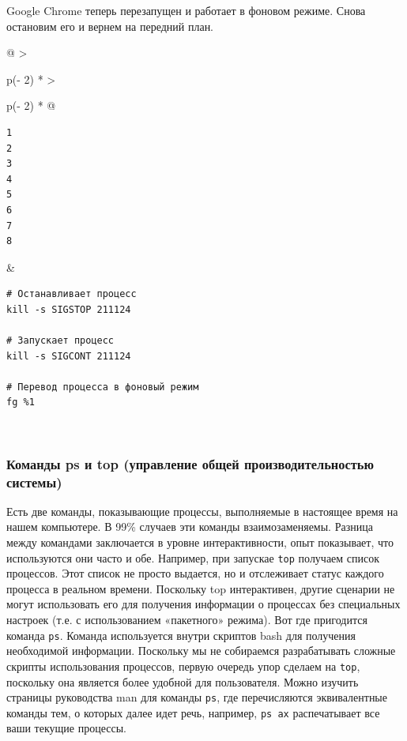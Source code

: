 \documentclass{report}
\begin{document}
Google Chrome теперь перезапущен и работает в фоновом режиме. Снова
остановим его и вернем на передний план.

\begin{longtable}[]{@{}
  >{\raggedright\arraybackslash}p{(\columnwidth - 2\tabcolsep) * }
  >{\raggedright\arraybackslash}p{(\columnwidth - 2\tabcolsep) * }@{}}
\toprule
\endhead
\begin{minipage}[t]{\linewidth}\raggedright
\begin{verbatim}
1
2
3
4
5
6
7
8
\end{verbatim}
\end{minipage} & \begin{minipage}[t]{\linewidth}\raggedright
\begin{verbatim}
# Останавливает процесс
kill -s SIGSTOP 211124

# Запускает процесс
kill -s SIGCONT 211124

# Перевод процесса в фоновый режим
fg %1
\end{verbatim}
\end{minipage} \\ \addlinespace
\bottomrule
\end{longtable}

\hypertarget{ps-and-top-commands-system-performance-management}{%
\subsubsection{\texorpdfstring{\protect\hyperlink{ps-and-top-commands-system-performance-management}{}Команды
ps и top (управление общей производительностью
системы)}{Команды ps и top (управление общей производительностью системы)}}\label{ps-and-top-commands-system-performance-management}}

Есть две команды, показывающие процессы, выполняемые в настоящее время
на нашем компьютере. В 99\% случаев эти команды взаимозаменяемы. Разница
между командами заключается в уровне интерактивности, опыт показывает,
что используются они часто и обе. Например, при запускае \texttt{top}
получаем список процессов. Этот список не просто выдается, но и
отслеживает статус каждого процесса в реальном времени. Поскольку top
интерактивен, другие сценарии не могут использовать его для получения
информации о процессах без специальных настроек (т.е. с использованием
«пакетного» режима). Вот где пригодится команда \texttt{ps}. Команда
используется внутри скриптов bash для получения необходимой информации.
Поскольку мы не собираемся разрабатывать сложные скрипты использования
процессов, первую очередь упор сделаем на \texttt{top}, поскольку она
является более удобной для пользователя. Можно изучить страницы
руководства man для команды \texttt{ps}, где перечисляются эквивалентные
команды тем, о которых далее идет речь, например, \texttt{ps\ ax}
распечатывает все ваши текущие процессы.
\end{document}
